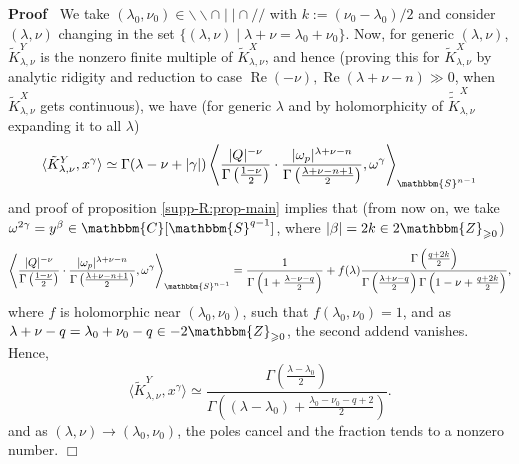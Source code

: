 \documentclass[12pt]{article}
\newcommand{\assign}{:=}
\newcommand{\tmop}[1]{\ensuremath{\operatorname{#1}}}
\renewenvironment{proof}{\noindent\textbf{Proof\ }}{\hspace*{\fill}$\Box$\medskip}
\theoremstyle{remark}
\begin{document}
\begin{proof}
  We take $(\lambda_0, \nu_0) \in \backslash\backslash \cap \mid \mid \cap /
  /$ with $k \assign (\nu_0 - \lambda_0) / 2$ and consider $(\lambda, \nu)$
  changing in the set $\{ (\lambda, \nu) \mid \lambda + \nu = \lambda_0 +
  \nu_0 \}$. Now, for generic $(\lambda, \nu)$, $\tilde{K}_{\lambda, \nu}^Y$
  is the nonzero finite multiple of $\tilde{K}_{\lambda, \nu}^X$, and hence
  (proving this for $\tilde{K}_{\lambda, \nu}^X$ by analytic ridigity and
  reduction to case $\tmop{Re} (- \nu), \tmop{Re} (\lambda + \nu - n) \gg 0$,
  when $\tilde{K}_{\lambda, \nu}^X$ gets continuous), we have (for generic
  $\lambda$ and by holomorphicity of $\widetilde{\tilde{K}}_{\lambda, \nu}^X$
  expanding it to all $\lambda$)
  \[ \langle \tilde{K}_{\lambda, \nu}^Y, x^{\gamma} \rangle \simeq \Gamma
     (\lambda - \nu + | \gamma |) \left\langle \frac{| Q |^{- \nu}}{\Gamma
     \left( \frac{1 - \nu}{2} \right)} \cdot \frac{| \omega_p |^{\lambda + \nu
     - n}}{\Gamma \left( \frac{\lambda + \nu - n + 1}{2} \right)},
     \omega^{\gamma} \right\rangle_{\mathbbm{S}^{n - 1}} \]
  and proof of proposition \ref{supp-R:prop-main} implies that (from now on,
  we take $\omega^{2 \gamma} = y^{\beta} \in \mathbbm{C} [\mathbbm{S}^{q -
  1}]$, where $| \beta | = 2 k \in 2\mathbbm{Z}_{\geqslant 0}$)
  \[ \left\langle \frac{| Q |^{- \nu}}{\Gamma \left( \frac{1 - \nu}{2}
     \right)} \cdot \frac{| \omega_p |^{\lambda + \nu - n}}{\Gamma \left(
     \frac{\lambda + \nu - n + 1}{2} \right)}, \omega^{\gamma}
     \right\rangle_{\mathbbm{S}^{n - 1}} = \frac{1}{\Gamma \left( 1 +
     \frac{\lambda - \nu - q}{2} \right)} + f (\lambda) \frac{\Gamma \left(
     \frac{q + 2 k}{2} \right)}{\Gamma \left( \frac{\lambda + \nu - q}{2}
     \right) \Gamma \left( 1 - \nu + \frac{q + 2 k}{2} \right)}, \]
  where $f$ is holomorphic near $(\lambda_0, \nu_0)$, such that $f (\lambda_0,
  \nu_0) = 1$, and as $\lambda + \nu - q = \lambda_0 + \nu_0 - q \in -
  2\mathbbm{Z}_{\geqslant 0}$, the second addend vanishes. Hence,
  \[ \langle \tilde{K}_{\lambda, \nu}^Y, x^{\gamma} \rangle \simeq
     \frac{\Gamma \left( \frac{\lambda - \lambda_0}{2} \right)}{\Gamma \left(
     (\lambda - \lambda_0) + \frac{\lambda_0 - \nu_0 - q + 2}{2} \right)} . \]
  and as $(\lambda, \nu) \rightarrow (\lambda_0, \nu_0)$, the poles cancel and
  the fraction tends to a nonzero number.
\end{proof}
\end{document}
